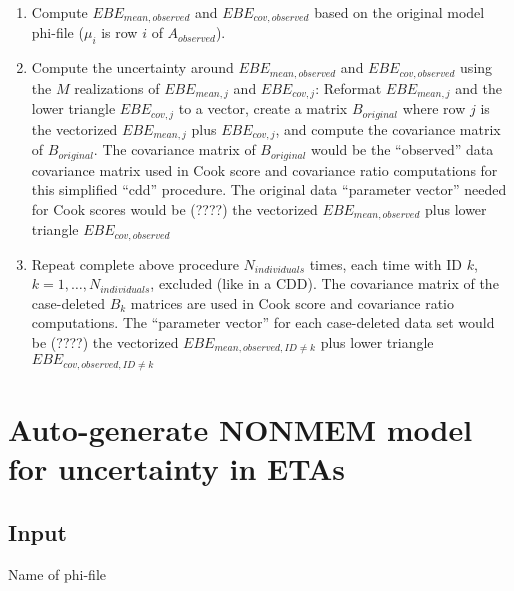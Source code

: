 \documentclass{article}
\begin{document}
\begin{enumerate}
\item Compute $EBE_{mean,observed}$ and $EBE_{cov,observed}$ based on the original model phi-file
  ($\mu_{i}$ is row $i$ of $A_{observed}$). 
\item Compute the uncertainty around $EBE_{mean,observed}$ and $EBE_{cov,observed}$ using the $M$ realizations
  of $EBE_{mean,j}$ and $EBE_{cov,j}$: Reformat $EBE_{mean,j}$ and the lower triangle $EBE_{cov,j}$ to a vector,
  create a matrix $B_{original}$ where row $j$ is the vectorized $EBE_{mean,j}$ plus $EBE_{cov,j}$,
  and compute the covariance matrix of $B_{original}$.
  The covariance matrix of $B_{original}$ would be the ``observed''
  data covariance matrix used in Cook score and covariance ratio computations for this simplified
  ``cdd'' procedure. The original data ``parameter vector'' needed for Cook scores would be (????)
  the vectorized $EBE_{mean,observed}$ plus lower triangle $EBE_{cov,observed}$
\item Repeat complete above procedure $N_{individuals}$ times, each time with ID
  $k$, $k=1,\ldots,N_{individuals}$, excluded (like in a CDD).
  The covariance matrix of the case-deleted $B_k$ matrices are used in Cook score and covariance
  ratio computations. The ``parameter vector'' for each case-deleted data set would be (????)
  the vectorized $EBE_{mean,observed,ID\neq k}$ plus lower triangle $EBE_{cov,observed,ID\neq k}$
\end{enumerate}

\section*{Auto-generate NONMEM model for uncertainty in ETAs}
\subsection*{Input} Name of phi-file
\end{document}
